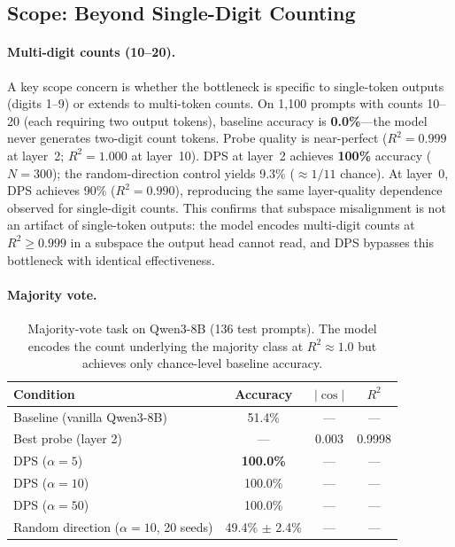 \documentclass{article}
\begin{document}
\subsection{Scope: Beyond Single-Digit Counting}
\label{sec:scope}

\paragraph{Multi-digit counts (10--20).}
A key scope concern is whether the bottleneck is specific to single-token
outputs (digits 1--9) or extends to multi-token counts.
On 1{,}100 prompts with counts 10--20 (each requiring two output tokens),
baseline accuracy is \textbf{0.0\%}---the model never generates two-digit count tokens.
Probe quality is near-perfect ($R^2 = 0.999$ at layer~2;
$R^2 = 1.000$ at layer~10).
DPS at layer~2 achieves \textbf{100\%} accuracy ($N = 300$);
the random-direction control yields 9.3\% ($\approx 1/11$ chance).
At layer~0, DPS achieves 90\% ($R^2 = 0.990$), reproducing the same
layer-quality dependence observed for single-digit counts.
This confirms that subspace misalignment is not an artifact of single-token outputs:
the model encodes multi-digit counts at $R^2 \geq 0.999$ in a subspace
the output head cannot read, and DPS bypasses this bottleneck with identical effectiveness.

\paragraph{Majority vote.}
\label{sec:majority_vote}

\begin{table}[h]
\centering
\caption{Majority-vote task on Qwen3-8B (136 test prompts).
The model encodes the count underlying the majority class at $R^2 \approx 1.0$
but achieves only chance-level baseline accuracy.}
\label{tab:majority_vote}
\begin{tabular}{lccc}
\toprule
Condition & Accuracy & $|\cos|$ & $R^2$ \\
\midrule
Baseline (vanilla Qwen3-8B) & 51.4\% & --- & --- \\
Best probe (layer 2) & --- & 0.003 & 0.9998 \\
DPS ($\alpha=5$) & \textbf{100.0\%} & --- & --- \\
DPS ($\alpha=10$) & 100.0\% & --- & --- \\
DPS ($\alpha=50$) & 100.0\% & --- & --- \\
Random direction ($\alpha=10$, 20 seeds) & 49.4\% $\pm$ 2.4\% & --- & --- \\
\bottomrule
\end{tabular}
\end{table}
\end{document}

